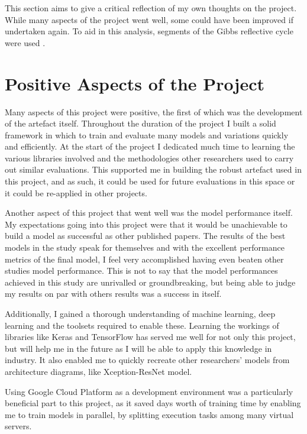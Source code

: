 This section aims to give a critical reflection of my own thoughts on the project. While many aspects of the project went well, some could have been improved if undertaken again. To aid in this analysis, segments of the Gibbs reflective cycle were used \citep{gibbs1988learning}.

\section{Positive Aspects of the Project}
Many aspects of this project were positive, the first of which was the development of the artefact itself. Throughout the duration of the project I built a solid framework in which to train and evaluate many models and variations quickly and efficiently. At the start of the project I dedicated much time to learning the various libraries involved and the methodologies other researchers used to carry out similar evaluations.  This supported me in building the robust artefact used in this project, and as such, it could be used for future evaluations in this space or it could be re-applied in other projects.

Another aspect of this project that went well was the model performance itself. My expectations going into this project were that it would be unachievable to build a model as successful as other published papers. The results of the best models in the study speak for themselves and with the excellent performance metrics of the final model, I feel very accomplished having even beaten other studies model performance. This is not to say that the model performances achieved in this study are unrivalled or groundbreaking, but being able to judge my results on par with others results was a success in itself.

Additionally, I gained a thorough understanding of machine learning, deep learning and the toolsets required to enable these. Learning the workings of libraries like Keras and TensorFlow has served me well for not only this project, but will help me in the future as I will be able to apply this knowledge in industry. It also enabled me to quickly recreate other researchers' models from architecture diagrams, like \cite{fitriasari2021improvement} Xception-ResNet model. 

Using Google Cloud Platform as a development environment was a particularly beneficial part to this project, as it saved days worth of training time by enabling me to train models in parallel, by splitting execution tasks among many virtual servers.

